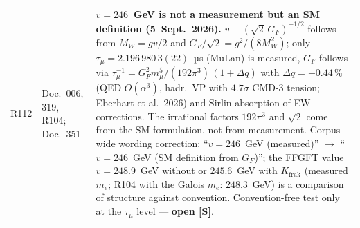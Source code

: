 \begin{longtable}{@{}p{0.9cm}p{3.1cm}p{10.2cm}@{}}
R112 & Doc.~006, 319, R104; Doc.~351 & \textbf{$v=246$~GeV is not a measurement but an SM definition \QM{} (5~Sept.~2026).} $v\equiv(\sqrt2\,G_F)^{-1/2}$ follows from $M_W=gv/2$ and $G_F/\sqrt2=g^2/(8M_W^2)$; only $\tau_\mu=2.196\,980\,3(22)$~µs (MuLan) is measured, $G_F$ follows via $\tau_\mu^{-1}=G_F^2m_\mu^5/(192\pi^3)\,(1+\Delta q)$ with $\Delta q=-0.44\,\%$ (QED $O(\alpha^3)$, hadr.\ VP with $4.7\sigma$ CMD-3 tension; Eberhart et al.\ 2026) and Sirlin absorption of EW corrections. The irrational factors $192\pi^3$ and $\sqrt2$ come from the SM formulation, not from measurement. Corpus-wide wording correction: ``$v=246$~GeV (measured)'' $\to$ ``$v=246$~GeV (SM definition from $G_F$)''; the FFGFT value $v=248.9$~GeV without or $245.6$~GeV with $K_{\mathrm{frak}}$ (measured $m_e$; R104 with the Galois $m_e$: $248.3$~GeV) is a comparison of structure against convention. Convention-free test only at the $\tau_\mu$ level --- \textbf{open [S]}. \\

\end{longtable}
